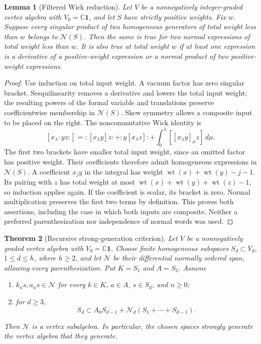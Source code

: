 \documentclass[11pt,a4paper]{article}
\newtheorem{theorem}{Theorem}[section]
\newtheorem{lemma}[theorem]{Lemma}
\theoremstyle{definition}
\DeclareMathOperator{\wt}{wt}
\newcommand{\CC}{\mathbb C}
\newcommand{\one}{\mathbf1}
\begin{document}
\begin{lemma}[Filtered Wick reduction]\label{lem:filtered-wick}
Let $V$ be a nonnegatively integer-graded vertex algebra with
$V_0=\CC\one$, and let $S$ have strictly positive weights. Fix $w$.
Suppose every singular product of two homogeneous generators of total
weight less than $w$ belongs to $\mathcal N(S)$. Then the same is
true for two normal expressions of total weight less than $w$.
It is also true at total weight $w$ if at least one expression is a
derivative of a positive-weight expression or a normal product of
two positive-weight expressions.
\end{lemma}
\begin{proof}
Use induction on total input weight. A vacuum factor has zero singular
bracket. Sesquilinearity removes a derivative and lowers the total input
weight; the resulting powers of the formal variable and translations
preserve coefficientwise membership in $\mathcal N(S)$. Skew symmetry
allows a composite input to be placed on the right. The noncommutative
Wick identity is
\begin{equation}\label{eq:wick}
 [x_\lambda:y z:]=:[x_\lambda y]z:+:y[x_\lambda z]:
             +\int_0^\lambda [[x_\lambda y]_\mu z]\,d\mu.
\end{equation}
The first two brackets have smaller total input weight, since an
omitted factor has positive weight. Their coefficients therefore admit
homogeneous expressions in $\mathcal N(S)$. A coefficient $x_jy$ in
the integral has weight $\wt(x)+\wt(y)-j-1$. Its pairing with $z$
has total weight at most $\wt(x)+\wt(y)+\wt(z)-1$, so induction
applies again. If the coefficient is scalar, its bracket is zero.
Normal multiplication preserves the first two terms by definition.
This proves both assertions, including the case in which both inputs
are composite. Neither a preferred parenthesization nor independence
of normal words was used.
\end{proof}

\begin{theorem}[Recursive strong-generation criterion]\label{thm:recursive}
Let \(V\) be a nonnegatively graded vertex algebra with \(V_0=\CC\one\).
Choose finite homogeneous subspaces \(S_d\subset V_d\),
\(1\leq d\leq h\), where $h\geq2$, and let \(\mathcal N\) be their differential
normally ordered span, allowing every parenthesization. Put
\(K=S_1\) and \(A=S_2\). Assume
\begin{enumerate}
\item \(k_ns,a_ns\in\mathcal N\) for every \(k\in K\), \(a\in A\),
\(s\in S_d\), and \(n\geq0\);
\item for \(d\geq3\),
\[
 S_d\subset A_0S_{d-1}+\mathcal N_d(S_1+\cdots+S_{d-1}).
\]
\end{enumerate}
Then \(\mathcal N\) is a vertex subalgebra. In particular, the chosen
spaces strongly generate the vertex algebra that they generate.
\end{theorem}
\end{document}
